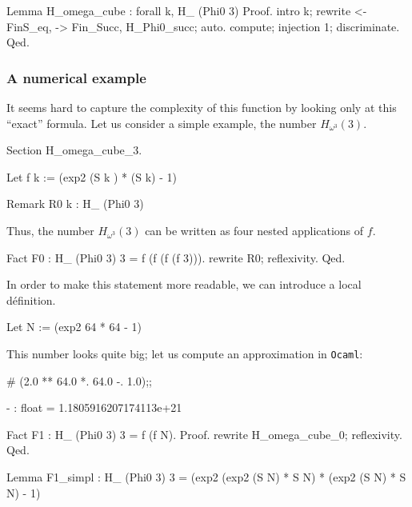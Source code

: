 \begin{Coqsrc}
Lemma H_omega_cube : forall k,
    H_ (Phi0 3)%
Proof.
  intro k; rewrite <-FinS_eq, -> Fin_Succ, H_Phi0_succ; auto.
  compute; injection 1; discriminate.
Qed.
\end{Coqsrc}

\subsubsection{A numerical example}

It seems hard to capture the complexity of this function by looking only at this
``exact'' formula. 
Let us consider a simple example, the number $H_{\omega^3}(3)$.  

\begin{Coqsrc}
Section H_omega_cube_3.
  
Let f k :=   (exp2 (S k ) * (S k) - 1)%

Remark R0 k :  H_ (Phi0 3)%
\end{Coqsrc}

Thus, the number $H_{\omega^3}(3)$ can be written as four nested applications of $f$.

\begin{Coqsrc}
Fact F0 : H_ (Phi0 3) 3 = f (f (f (f 3))).
 rewrite R0; reflexivity. 
Qed.
\end{Coqsrc}

In order to make this statement more readable, we can introduce a local définition.

\begin{Coqsrc}
Let N := (exp2 64 * 64 - 1)%
\end{Coqsrc}

This number looks quite big; let us compute an approximation in \texttt{Ocaml}:


\begin{Coqsrc}
# (2.0 ** 64.0 *. 64.0 -. 1.0);; 
\end{Coqsrc}

\begin{Coqanswer}
- : float = 1.1805916207174113e+21
\end{Coqanswer}


\begin{Coqsrc}
Fact F1 : H_ (Phi0 3) 3 = f (f N).
Proof.
 rewrite H_omega_cube_0; reflexivity. 
Qed.


Lemma F1_simpl : H_ (Phi0 3) 3 =
                 (exp2 (exp2 (S N) * S N) * (exp2 (S N) * S N) - 1)%

\end{Coqsrc}


